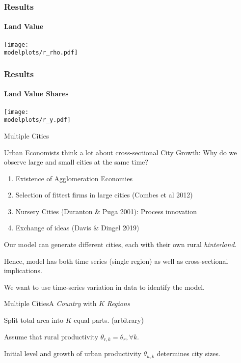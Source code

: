 \documentclass[aspectratio=169]{beamer}
\begin{document}
\begin{v75mins}
\begin{frame}
\frametitle{Results}
\framesubtitle{Land Value}

\begin{adjustbox}{center}
\texttt{[image: \\modelplots/r\_rho.pdf]}\end{adjustbox}
\end{frame}

\begin{frame}
\frametitle{Results}
\framesubtitle{Land Value Shares}

\begin{adjustbox}{center}
\texttt{[image: \\modelplots/r\_y.pdf]}\end{adjustbox}
\end{frame}



\begin{frame}{Multiple Cities}

\begin{midi}
\item Urban Economists think a lot about cross-sectional City Growth: Why do we observe large and small cities at the same time?
\begin{enumerate}
\item Existence of Agglomeration Economies
\item Selection of fittest firms in large cities (Combes et al 2012)
\item Nursery Cities (Duranton \& Puga 2001): Process innovation
\item Exchange of ideas (Davis \& Dingel 2019)
\end{enumerate}
\item Our model can generate different cities, each with their own rural \emph{hinterland}.
\item Hence, model has both time series (single region) as well as cross-sectional implications.
\item We want to use time-series variation in data to identify the model.
\end{midi}
\end{frame}

\begin{frame}{Multiple Cities}{A \emph{Country} with $K$ \emph{Regions}}
\begin{widei}
\item Split total area into $K$ equal parts. (arbitrary)
\item Assume that rural productivity $\theta_{r,k}=\theta_{r}, \forall k$.
\item Initial level and growth of urban productivity $\theta_{u,k}$ determines city sizes.


\end{widei}
\end{frame}
\end{v75mins}
\end{document}
